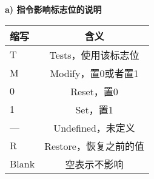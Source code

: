 \vspace{5cm}
\begin{table}[!htbp]
    \label{tab:flag_effect}
    \centering
    \footnotesize %
    \setlength{\tabcolsep}{4pt} %
    \renewcommand{\arraystretch}{1.2} %
    
    \begin{minipage}{0.4\textwidth} %
        \centering
        \textbf{a) 指令影响标志位的说明} \\
        \vspace{0.2cm}
        \begin{tabular}{l c}
            \hline
            \textbf{缩写} & \textbf{含义} \\ 
            \hline
            T & Tests，使用该标志位 \\ 
            M & Modify，置0或者置1 \\ 
            0 & Reset，置0 \\ 
            1 & Set，置1 \\ 
            --- & Undefined，未定义 \\ 
            R & Restore，恢复之前的值 \\ 
            Blank & 空表示不影响 \\ 
            \hline
        \end{tabular}
        
        \vspace{0.5cm} %
        

\end{minipage}
\end{table}
